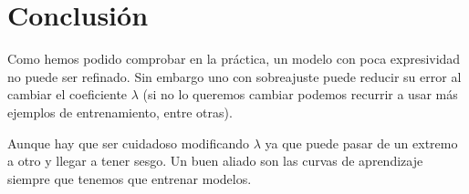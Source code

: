 \documentclass{article}
\begin{document}
\section{Conclusión}
Como hemos podido comprobar en la práctica, un modelo con poca expresividad no puede ser refinado. Sin embargo uno con sobreajuste puede reducir su error al cambiar el coeficiente $\lambda$ (si no lo queremos cambiar podemos recurrir a usar más ejemplos de entrenamiento, entre otras).

Aunque hay que ser cuidadoso modificando $\lambda$ ya que puede pasar de un extremo a otro y llegar a tener sesgo. Un buen aliado son las curvas de aprendizaje siempre que tenemos que entrenar modelos.
\end{document}
